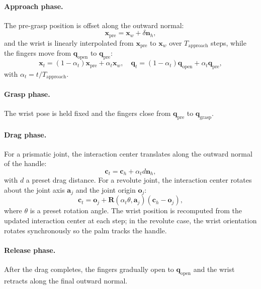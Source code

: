 \documentclass{llmxive}
\begin{document}
\paragraph{Approach phase.}
The pre-grasp position is offset along the outward normal:
\begin{equation}
\mathbf{x}_{\mathrm{pre}} = \mathbf{x}_w + \delta \mathbf{n}_h,
\end{equation}
and the wrist is linearly interpolated from $\mathbf{x}_{\mathrm{pre}}$
to $\mathbf{x}_w$ over $T_{\mathrm{approach}}$ steps, while the
fingers move from $\mathbf{q}_{\mathrm{open}}$ to
$\mathbf{q}_{\mathrm{pre}}$:
\begin{equation}
\mathbf{x}_t = (1-\alpha_t)\mathbf{x}_{\mathrm{pre}}
+ \alpha_t \mathbf{x}_w,\quad
\mathbf{q}_t = (1-\alpha_t)\mathbf{q}_{\mathrm{open}}
+ \alpha_t \mathbf{q}_{\mathrm{pre}},
\end{equation}
with $\alpha_t = t/T_{\mathrm{approach}}$.

\paragraph{Grasp phase.}
The wrist pose is held fixed and the fingers close from
$\mathbf{q}_{\mathrm{pre}}$ to $\mathbf{q}_{\mathrm{grasp}}$.

\paragraph{Drag phase.}
For a prismatic joint, the interaction center translates along the
outward normal of the handle:
\begin{equation}
\mathbf{c}_t = \mathbf{c}_h + \alpha_t d \mathbf{n}_h,
\end{equation}
with $d$ a preset drag distance. For a revolute joint, the
interaction center rotates about the joint axis $\mathbf{a}_j$ and
the joint origin $\mathbf{o}_j$:
\begin{equation}
\mathbf{c}_t = \mathbf{o}_j + \mathbf{R}(\alpha_t\theta,
\mathbf{a}_j)(\mathbf{c}_h - \mathbf{o}_j),
\end{equation}
where $\theta$ is a preset rotation angle. The wrist position is
recomputed from the updated interaction center at each step; in the
revolute case, the wrist orientation rotates synchronously so the
palm tracks the handle.

\paragraph{Release phase.}
After the drag completes, the fingers gradually open to
$\mathbf{q}_{\mathrm{open}}$ and the wrist retracts along the final
outward normal.
\end{document}
